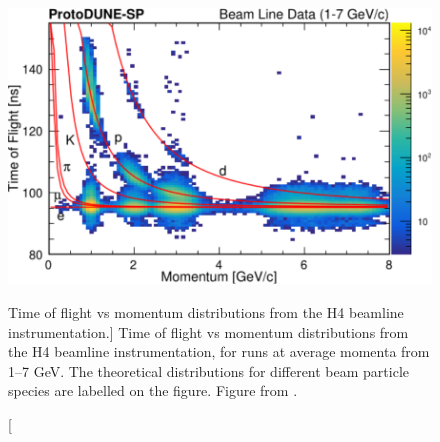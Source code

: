\begin{figure}

	\centering

	\includegraphics[width=\textwidth]{figures/h4_tof.pdf}

	\caption
	[Time of flight vs momentum distributions from the H4 beamline
	instrumentation.]
	{Time of flight vs momentum distributions from the H4 beamline
	instrumentation, for \protodune{} runs at average momenta from 1--7 GeV. The
	theoretical distributions for different beam particle species are labelled on
	the figure. Figure from \cite{protoduneperf}.}

	\label{fig:h4_tof}

\end{figure}

